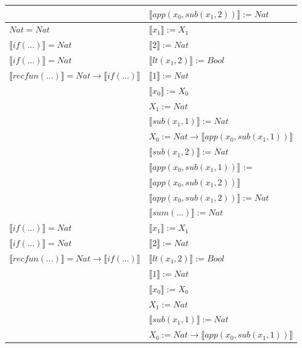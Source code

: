 \begin{exercise}
\begin{description}
\begin{center}
\begin{longtable}[!h]{ | l | l | }
			     & $ \llbracket app(x_0, sub(x_1,2)) \rrbracket := Nat$ \\
                    \hline 
                        $Nat = Nat$ &  $ \llbracket x_1 \rrbracket := X_1$\\
                        $ \llbracket if(...) \rrbracket = Nat$ & $ \llbracket 2 \rrbracket := Nat$\\
                        $ \llbracket if(...) \rrbracket =  Nat$ & $ \llbracket lt(x_1 , 2) \rrbracket := Bool$\\
                        $ \llbracket recfun(...) \rrbracket =   Nat  \to  \llbracket if(...) \rrbracket $ & $ \llbracket 1 \rrbracket := Nat$\\
                        & $ \llbracket x_0 \rrbracket := X_0$\\ 
                        &  $X_1 := Nat$\\  
			     & $ \llbracket sub(x_1,1) \rrbracket := Nat$\\
			     & $X_0 := Nat \to  \llbracket app(x_0, sub(x_1,1)) \rrbracket$ \\
			     & $ \llbracket sub(x_1,2) \rrbracket := Nat$ \\
			     & $ \llbracket app(x_0, sub(x_1,1)) \rrbracket$ := \\
			     & $ \llbracket app(x_0, sub(x_1,2)) \rrbracket$\\ 
			     & $ \llbracket app(x_0, sub(x_1,2)) \rrbracket := Nat$ \\
			     & $ \llbracket sum(...) \rrbracket := Nat$ \\
                    \hline 
                        $ \llbracket if(...) \rrbracket = Nat$ & $ \llbracket x_1 \rrbracket := X_1$\\
                        $ \llbracket if(...) \rrbracket = Nat$ & $ \llbracket 2 \rrbracket := Nat$\\
                        $ \llbracket recfun(...) \rrbracket =   Nat  \to  \llbracket if(...) \rrbracket $ & $ \llbracket lt(x_1 , 2) \rrbracket := Bool$\\
                        & $ \llbracket 1 \rrbracket := Nat$\\ 
                        & $ \llbracket x_0 \rrbracket := X_0$\\  
			     & $X_1 := Nat$\\
			     & $ \llbracket sub(x_1,1) \rrbracket := Nat$ \\
			     & $X_0 := Nat \to  \llbracket app(x_0, sub(x_1,1)) \rrbracket$ \\

\end{longtable}
\end{center}
\end{description}
\end{exercise}
